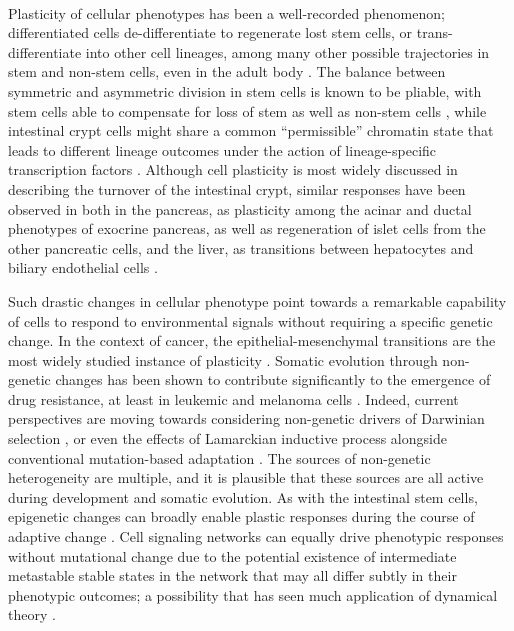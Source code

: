 \documentclass[12pt, letterpaper, onecolumn]{article}
\begin{document}
	
	\paragraph{\empty}Plasticity of cellular phenotypes has been a well-recorded phenomenon; differentiated cells de-differentiate to regenerate lost stem cells, or trans-differentiate into other cell lineages, among many other possible trajectories in stem and non-stem cells, even in the adult body \cite{Varga,Tetteh2015}. The balance between symmetric and asymmetric division in stem cells is known to be pliable, with stem cells able to compensate for loss of stem as well as non-stem cells \cite{Morrison2006}, while intestinal crypt cells might share a common ``permissible'' chromatin state that leads to different lineage outcomes under the action of lineage-specific transcription factors \cite{Kim2014a}. Although cell plasticity is most widely discussed in describing the turnover of the intestinal crypt, similar responses have been observed in both in the pancreas, as plasticity among the acinar and ductal phenotypes of exocrine pancreas, as well as regeneration of islet cells from the other pancreatic cells, and the liver, as transitions between hepatocytes and biliary endothelial cells \cite{Yanger2013,Kopp2016}.
	
	Such drastic changes in cellular phenotype point towards a remarkable capability of cells to respond to environmental signals without requiring a specific genetic change. In the context of cancer, the epithelial-mesenchymal transitions are the most widely studied instance of plasticity \cite{Ye2015}. Somatic evolution through non-genetic changes has been shown to contribute significantly to the emergence of drug resistance, at least in leukemic \cite{Pisco2013} and melanoma cells \cite{Su2017}. Indeed, current perspectives are moving towards considering non-genetic drivers of Darwinian selection \cite{Brock2009a}, or even the effects of Lamarckian inductive process alongside conventional mutation-based adaptation \cite{Huang2012a}. The sources of non-genetic heterogeneity are multiple, and it is plausible that these sources are all active during development and somatic evolution. As with the intestinal stem cells, epigenetic changes can broadly enable plastic responses during the course of adaptive change \cite{Flavahan2017}. Cell signaling networks can equally drive phenotypic responses without mutational change due to the potential existence of intermediate metastable stable states in the network that may all differ subtly in their phenotypic outcomes; a possibility that has seen much application of dynamical theory \cite{Jolly2018}.
	
\end{document}
